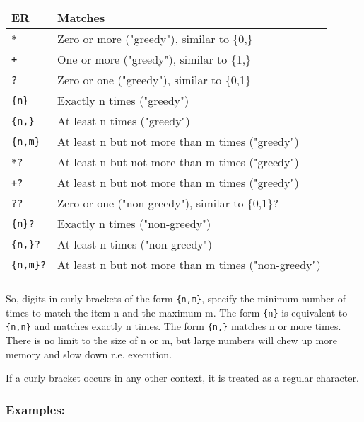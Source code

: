 \begin{footnotesize}
  \begin{tabularx}{\textwidth}{>{\hsize=0.3\hsize}X>{\hsize=0.7\hsize}X}\\
    \hline
    \textbf{ER} & \textbf{Matches} \\
    \hline
    \texttt{*} & Zero or more ("greedy"), similar to \{0,\} \\
    \texttt{+} & One or more ("greedy"), similar to \{1,\} \\
    \texttt{?} & Zero or one ("greedy"), similar to \{0,1\} \\
    \texttt{\{n\}} & Exactly n times ("greedy") \\
    \texttt{\{n,\}} & At least n times ("greedy") \\
    \texttt{\{n,m\}} & At least n but not more than m times ("greedy") \\
    \texttt{*?} & At least n but not more than m times ("greedy") \\
    \texttt{+?} & At least n but not more than m times ("greedy") \\
    \texttt{??} & Zero or one ("non-greedy"), similar to \{0,1\}? \\
    \texttt{\{n\}?} & Exactly n times ("non-greedy") \\
    \texttt{\{n,\}?} & At least n times ("non-greedy") \\
    \texttt{\{n,m\}?} & At least n but not more than m times ("non-greedy") \\
    \hline
    \\
  \end{tabularx}
\end{footnotesize}

So, digits in curly brackets of the form \texttt{\{n,m\}}, specify the
minimum number of times to match the item n and the maximum m. The form
\texttt{\{n\}} is equivalent to \texttt{\{n,n\}} and matches exactly n
times. The form \texttt{\{n,\}} matches n or more times. There is no
limit to the size of n or m, but large numbers will chew up more memory
and slow down r.e. execution.

If a curly bracket occurs in any other context, it is treated as a
regular character.


\subsubsection{Examples:}\\

